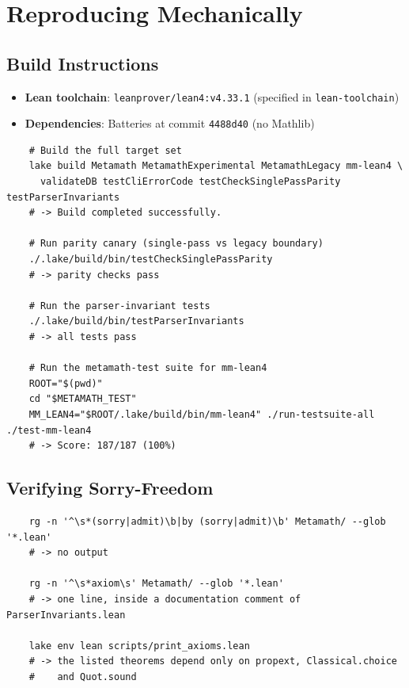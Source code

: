 \documentclass[11pt]{article}
\newcommand{\file}[1]{\texttt{#1}}
\begin{document}
\section{Reproducing Mechanically}
\label{sec:reproduce}

\subsection{Build Instructions}

\begin{itemize}[leftmargin=2em]
\item \textbf{Lean toolchain}: \texttt{leanprover/lean4:v4.33.1}
  (specified in \file{lean-toolchain})
\item \textbf{Dependencies}: Batteries at commit \texttt{4488d40} (no Mathlib)
\end{itemize}

\begin{verbatim}
    # Build the full target set
    lake build Metamath MetamathExperimental MetamathLegacy mm-lean4 \
      validateDB testCliErrorCode testCheckSinglePassParity testParserInvariants
    # -> Build completed successfully.

    # Run parity canary (single-pass vs legacy boundary)
    ./.lake/build/bin/testCheckSinglePassParity
    # -> parity checks pass

    # Run the parser-invariant tests
    ./.lake/build/bin/testParserInvariants
    # -> all tests pass

    # Run the metamath-test suite for mm-lean4
    ROOT="$(pwd)"
    cd "$METAMATH_TEST"
    MM_LEAN4="$ROOT/.lake/build/bin/mm-lean4" ./run-testsuite-all ./test-mm-lean4
    # -> Score: 187/187 (100%)
\end{verbatim}

\subsection{Verifying Sorry-Freedom}

\begin{verbatim}
    rg -n '^\s*(sorry|admit)\b|by (sorry|admit)\b' Metamath/ --glob '*.lean'
    # -> no output

    rg -n '^\s*axiom\s' Metamath/ --glob '*.lean'
    # -> one line, inside a documentation comment of ParserInvariants.lean

    lake env lean scripts/print_axioms.lean
    # -> the listed theorems depend only on propext, Classical.choice
    #    and Quot.sound
\end{verbatim}
\end{document}
